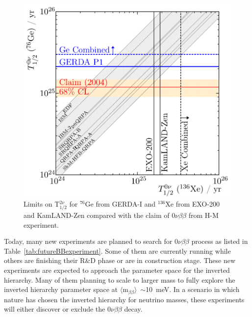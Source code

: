 \documentclass[main.tex]{subfiles}
\begin{document}
\begin{figure}[h!]
\begin{center}
\includegraphics[scale=0.30]{pictures/Chap2/Gerda-EXO-combined.png}
\caption{Limits on T$_{\text{1/2}}^{\text{2}\nu}$ for $^{\text{76}}$Ge from GERDA-I and $^{\text{136}}$Xe from EXO-200 and KamLAND-Zen compared with the claim of 0$\nu\beta\beta$ from H-M experiment.}
\label{Gerda-EXO-combined}
\end{center}
\end{figure}


\FloatBarrier


\NI Today, many new experiments are planned to search for 0$\nu\beta\beta$ process as listed in Table~\ref{tab:futureBBexperiment}. Some of them are currently running while others are finishing their R\&D phase or are in construction stage. These new experiments are expected to approach the parameter space for the inverted hierarchy. Many of them planning to scale to larger mass to fully explore the inverted hierarchy parameter space at $ \langle \text{m}_{\beta\beta} \rangle$~$\sim$10~meV. In a scenario in which nature has chosen the inverted hierarchy for neutrino masses, these experiments will either discover or exclude the 0$\nu\beta\beta$ decay.
\end{document}
